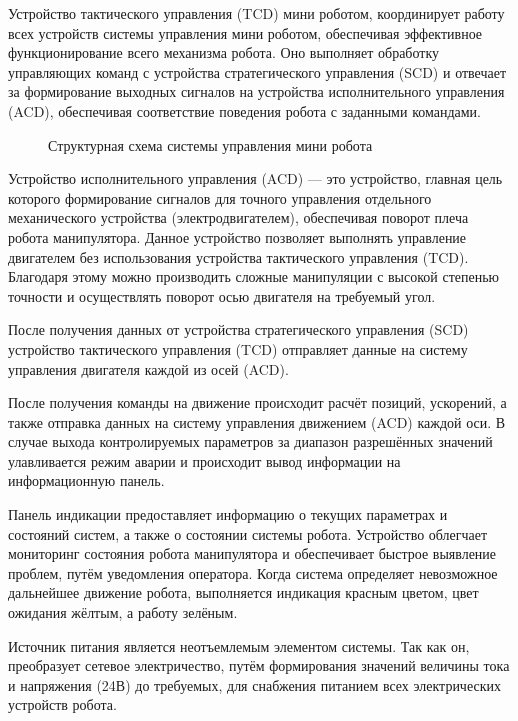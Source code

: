 Устройство тактического управления (TCD) мини роботом, координирует работу всех устройств системы управления мини роботом, обеспечивая эффективное функционирование всего механизма робота. Оно выполняет обработку управляющих команд с устройства стратегического управления (SCD) и отвечает за формирование выходных сигналов на устройства исполнительного управления (ACD), обеспечивая соответствие поведения робота с заданными командами.

\begin{figure}[H]
	\centering
	
	\caption{Структурная схема системы управления мини робота}
	\label{Structural}
\end{figure}

Устройство исполнительного управления (ACD) — это устройство, главная цель которого формирование сигналов для точного управления отдельного механического устройства (электродвигателем), обеспечивая поворот плеча робота манипулятора. Данное устройство позволяет выполнять управление двигателем без использования устройства тактического управления (TCD). Благодаря этому можно производить сложные манипуляции с высокой степенью точности и осуществлять поворот осью двигателя на требуемый угол.

После получения данных от устройства стратегического управления (SCD) устройство тактического управления (TCD) отправляет данные на систему управления двигателя каждой из осей (ACD).

После получения команды на движение происходит расчёт позиций, ускорений, а также отправка данных на систему управления движением (ACD) каждой оси. В случае выхода контролируемых параметров за диапазон разрешённых значений улавливается режим аварии и происходит вывод информации на информационную панель.

Панель индикации предоставляет информацию о текущих параметрах и состояний систем, а также о состоянии системы робота. Устройство облегчает мониторинг состояния робота манипулятора и обеспечивает быстрое выявление проблем, путём уведомления оператора. Когда система определяет невозможное дальнейшее движение робота, выполняется индикация красным цветом, цвет ожидания жёлтым, а работу зелёным.

Источник питания является неотъемлемым элементом системы. Так как он, преобразует сетевое электричество, путём формирования значений величины тока и напряжения (24В) до требуемых, для снабжения питанием всех электрических устройств робота. 

